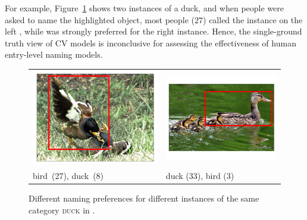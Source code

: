 For example, Figure~\ref{fig:duck} shows two instances of a duck, and when people were asked to name the highlighted object, most people ($27$) called the instance on the left , while  was strongly preferred for the right instance. 
Hence, the single-ground truth view of CV models %
is inconclusive for assessing the effectiveness of \lv human entry-level naming models.
\begin{figure}[t]
	\centering
	\small
	\begin{tabular}{p{3cm}p{3cm}}
		\centering
		\includegraphics[scale=0.15]{images/2327551_2960743_seed_ambiguous.png} &
		\includegraphics[scale=0.15]{images/2358126_805887_singleton_obj.png}\\
		bird\ (27),  duck\ (8) & duck (33), bird (3)\\
	\end{tabular}
	
	\caption{Different naming preferences for different instances of the same category \textsc{duck} in \mn.\label{fig:duck}}
\end{figure}
